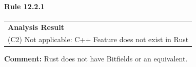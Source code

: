\paragraph{Rule 12.2.1}
\begin{longtable}{p{13cm}}
\textbf{Analysis Result} \\
(C2) Not applicable: C++ Feature does not exist in Rust \\
\end{longtable}
\textbf{Comment:} Rust does not have Bitfields or an equivalent. \\
